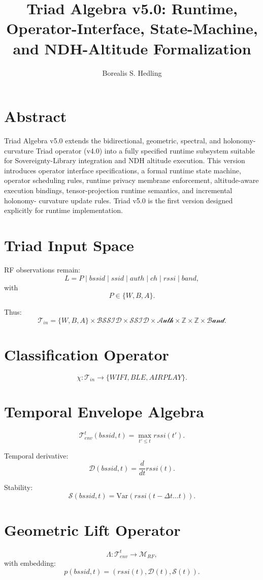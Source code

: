 \documentclass[11pt]{article}
\title{Triad Algebra v5.0: Runtime, Operator-Interface, State-Machine, and NDH-Altitude Formalization}
\author{Borealis S. Hedling}
\date{}
\begin{document}
\maketitle

\section*{Abstract}
Triad Algebra v5.0 extends the bidirectional, geometric, spectral, and holonomy-
curvature Triad operator (v4.0) into a fully specified runtime subsystem suitable
for Sovereignty-Library integration and NDH altitude execution. This version
introduces operator interface specifications, a formal runtime state machine,
operator scheduling rules, runtime privacy membrane enforcement, altitude-aware
execution bindings, tensor-projection runtime semantics, and incremental holonomy-
curvature update rules. Triad v5.0 is the first version designed explicitly for
runtime implementation.

\section{Triad Input Space}
RF observations remain:
\[
L = P \mid bssid \mid ssid \mid auth \mid ch \mid rssi \mid band,
\]
with
\[
P \in \{W, B, A\}.
\]

Thus:
\[
\mathcal{T}_{in}
= \{W,B,A\}
\times \mathcal{BSSID}
\times \mathcal{SSID}
\times \mathcal{Auth}
\times \mathbb{Z}
\times \mathbb{Z}
\times \mathcal{Band}.
\]

\section{Classification Operator}
\[
\chi : \mathcal{T}_{in} \to \{WIFI, BLE, AIRPLAY\}.
\]

\section{Temporal Envelope Algebra}
\[
\mathcal{T}_{env}^{t}(bssid,t)
= \max_{t' \le t} rssi(t').
\]

Temporal derivative:
\[
\mathcal{D}(bssid,t) = \frac{d}{dt} rssi(t).
\]

Stability:
\[
\mathcal{S}(bssid,t) = \mathrm{Var}(rssi(t-\Delta t \ldots t)).
\]

\section{Geometric Lift Operator}
\[
\Lambda : \mathcal{T}_{env}^{t} \to \mathcal{M}_{RF},
\]
with embedding:
\[
p(bssid,t) = (rssi(t), \mathcal{D}(t), \mathcal{S}(t)).
\]
\end{document}
